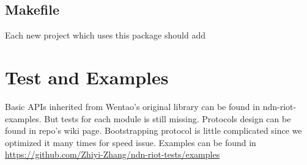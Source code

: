 \documentclass[a4paper, 11pt]{article}
\begin{document}
    \subsection{Makefile}
    Each new project which uses this package should add

    \section{Test and Examples}
    Basic APIs inherited from Wentao's original library can be found in ndn-riot-examples. But tests for each module is still missing. Protocols design can be found in repo's wiki page. Bootstrapping protocol is little complicated since we optimized it many times for speed issue.      
    Examples can be found in \url{https://github.com/Zhiyi-Zhang/ndn-riot-tests/examples} 
\end{document}
